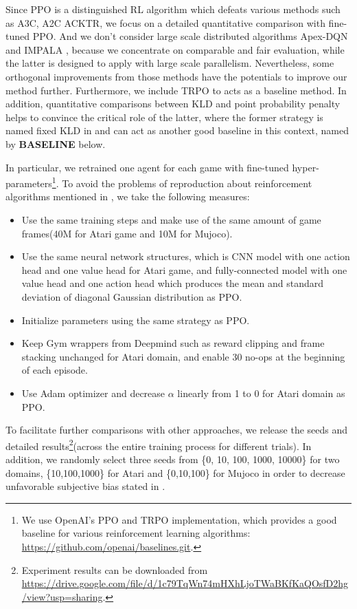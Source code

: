 \documentclass{article}
\begin{document}
Since PPO is  a distinguished RL algorithm which defeats various methods such as A3C, A2C ACKTR, we focus on a detailed quantitative comparison with fine-tuned PPO. And we don't consider large scale distributed algorithms Apex-DQN \cite{horgan2018distributed} and IMPALA \cite{espeholt2018impala}, because we concentrate on comparable and fair evaluation, while the latter is designed to apply with large scale parallelism. Nevertheless, some orthogonal improvements from those methods have the potentials to  improve our method further. Furthermore, we include TRPO to acts as a baseline method. In addition, quantitative comparisons between KLD and  point probability penalty helps to convince the critical role of the latter, where the former strategy is named fixed KLD in \cite{2017arXiv170706347S} and can act as another good baseline in this context, named by \textbf{BASELINE} below.

In particular, we retrained one agent for each game with fine-tuned hyper-parameters\footnote{
	We use OpenAI's PPO and TRPO implementation, which provides a good baseline for various reinforcement learning algorithms: \url{https://github.com/openai/baselines.git}.}. 
To avoid the problems of reproduction about reinforcement algorithms mentioned in \cite{henderson2017deep}, we take the following measures:

\begin{itemize}
	\item Use the same training steps and make use of the same amount of game frames(40M for Atari game and 10M for Mujoco)\@.
	\item Use the same neural network structures, which is CNN model with one action head and one value head for Atari game, and fully-connected model with one value head and one action head which produces the mean and standard deviation of diagonal Gaussian distribution as PPO\@. 
	\item Initialize  parameters using the  same strategy as PPO\@.
	\item Keep Gym wrappers from  Deepmind such as reward clipping and frame stacking unchanged for Atari domain, and enable 30 no-ops at the beginning of each episode\@.
	\item Use Adam optimizer \cite{kingma2014adam} and decrease  $\alpha$ linearly from 1 to 0 for Atari domain as PPO\@.
\end{itemize}

To facilitate further comparisons with other approaches,  we release the seeds and  detailed results\footnote{Experiment results can be downloaded from \url{https://drive.google.com/file/d/1c79TqWn74mHXhLjoTWaBKfKaQOsfD2hg/view?usp=sharing}.}(across the entire training process for different trials). In addition, we randomly select three seeds from \{0, 10, 100, 1000, 10000\} for two domains, \{10,100,1000\} for Atari and \{0,10,100\} for Mujoco in order to decrease unfavorable subjective bias stated in \cite{henderson2017deep}.
\end{document}
